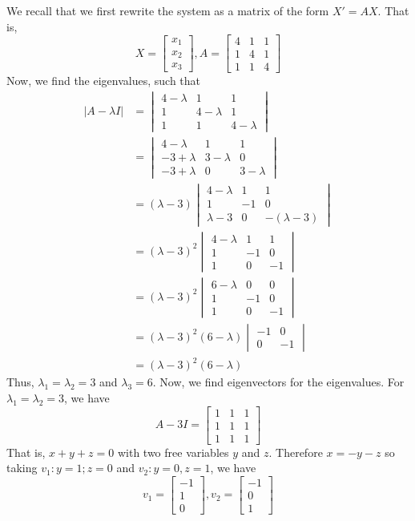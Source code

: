 \documentclass[11pt]{article}
\theoremstyle{plain} %
\theoremstyle{definition}
\theoremstyle{example}
\theoremstyle{remark}
\begin{document}
We recall that we first rewrite the system as a matrix of the form $X' = AX$. That is, $$X = \begin{bmatrix}x_1\\x_2\\x_3\end{bmatrix}, A = \begin{bmatrix}4 & 1 & 1 \\ 1 & 4 & 1 \\ 1 & 1 & 4\end{bmatrix}$$
Now, we find the eigenvalues, such that 
\begin{align*}
|A-\lambda I| &= \begin{vmatrix}4-\lambda & 1 & 1 \\ 1 & 4-\lambda & 1 \\ 1 & 1 & 4-\lambda\end{vmatrix}\\
&= \begin{vmatrix}4-\lambda & 1 & 1 \\ -3+ \lambda & 3-\lambda & 0  \\-3+\lambda &0&3-\lambda\end{vmatrix}\\
&= (\lambda-3) \begin{vmatrix}4-\lambda & 1 & 1 \\ 1 & -1 & 0\\\lambda-3 & 0 & -(\lambda-3)\end{vmatrix}\\
&= (\lambda-3)^2\begin{vmatrix}4-\lambda & 1 & 1\\ 1 & -1 & 0\\ 1 & 0 & -1\end{vmatrix}\\
&=  (\lambda-3)^2\begin{vmatrix}6-\lambda & 0 & 0\\ 1 & -1 & 0\\ 1 & 0 & -1\end{vmatrix}\\
&= (\lambda-3)^2(6-\lambda)\begin{vmatrix}-1 & 0 \\0 & -1\end{vmatrix}\\
&= (\lambda-3)^2(6-\lambda)
\end{align*}
Thus, $\lambda_1=\lambda_2 = 3$ and $\lambda_3 = 6$. Now, we find eigenvectors for the eigenvalues. For $\lambda_1=\lambda_2 = 3$, we have $$A-3I = \begin{bmatrix}1 & 1 & 1\\ 1 & 1 & 1 \\ 1 & 1 & 1\end{bmatrix}$$ That is, $x+y+z=0$ with two free variables $y$ and $z$. Therefore $x = -y-z$ so taking $v_1: y = 1; z= 0$ and $v_2: y=0, z=1$, we have $$v_1=\begin{bmatrix}-1 \\ 1 \\ 0\end{bmatrix}, v_2=\begin{bmatrix}-1 \\ 0 \\ 1\end{bmatrix}$$
\end{document}
